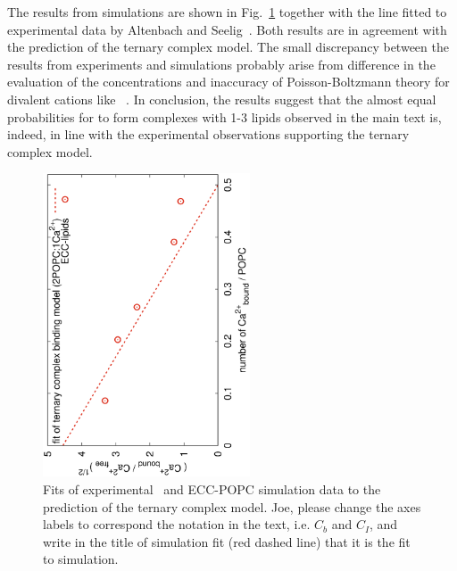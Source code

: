 \documentclass[journal=jpcbfk]{achemso}
\begin{document}
The results from simulations are shown in Fig.~\ref{fig:cacl-bind}
together with the line fitted to experimental data by Altenbach and Seelig~\cite{altenbach84}.
Both results are in agreement with the prediction of the ternary complex model.
The small discrepancy between the results from experiments and simulations probably
arise from difference in the evaluation of the concentrations and
inaccuracy of Poisson-Boltzmann theory for divalent cations like ~\cite{Andelman1995}. 
In conclusion, the results suggest that the almost equal probabilities for
 to form complexes with 1-3 lipids observed in the main text is,
indeed, in line with the experimental observations supporting the ternary complex model.
\newpage
\begin{figure}[!h]
  \centering
  \includegraphics[height=9.0cm,angle=-90]{../Fig/bound-CAs_conc-eccl17.eps}
  \caption{\label{fig:cacl-bind}
    Fits of experimental~\cite{altenbach84} and ECC-POPC simulation data to
    the prediction of the ternary complex model.
    {\color{red} Joe, please change the axes labels to correspond the notation in the text, i.e. $C_b$ and $C_I$,
    and write in the title of simulation fit (red dashed line) that it is the fit to simulation.}
    }
\end{figure}
\end{document}
